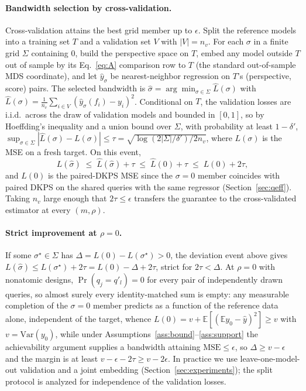 \documentclass{article}
\theoremstyle{definition}
\theoremstyle{plain}
\begin{document}
\paragraph{Bandwidth selection by cross-validation.} Cross-validation attains
the best grid member up to $\epsilon$. Split the reference models into a training
set $T$ and a validation set $V$ with $|V|=n_v$. For each $\sigma$ in a finite grid
$\Sigma$ containing $0$, build the
perspective space on $T$, embed any model outside $T$ out of sample by its
Eq.~\eqref{eq:A} comparison row to $T$ (the standard out-of-sample MDS coordinate), and let
$\hat y_\sigma$ be nearest-neighbor regression on $T$'s (perspective, score) pairs. The
selected bandwidth is $\hat\sigma=\arg\min_{\sigma\in\Sigma}\hat L(\sigma)$ with
$\hat L(\sigma)=\tfrac1{n_v}\sum_{i\in V}(\hat y_\sigma(f_i)-y_i)^2$. Conditional on
$T$, the validation losses are i.i.d.\ across the draw of validation models and bounded
in $[0,1]$, so by Hoeffding's inequality and a union bound over $\Sigma$, with
probability at least $1-\delta'$,
$\sup_{\sigma\in\Sigma}|\hat L(\sigma)-L(\sigma)|\le
\tau=\sqrt{\log(2|\Sigma|/\delta')/2n_v}$, where $L(\sigma)$ is the MSE on a fresh
target. On this event,
\[
L(\hat\sigma)\;\le\;\hat L(\hat\sigma)+\tau\;\le\;\hat L(0)+\tau
\;\le\;L(0)+2\tau,
\]
and $L(0)$ is the paired-DKPS MSE since the $\sigma=0$ member coincides with paired
DKPS on the shared queries with the same regressor (Section~\ref{sec:qeff}). Taking
$n_v$ large enough that $2\tau\le\epsilon$ transfers the guarantee to the
cross-validated estimator at every $(m,\rho)$.

\paragraph{Strict improvement at $\rho=0$.} If some
$\sigma^\star\in\Sigma$ has $\Delta=L(0)-L(\sigma^\star)>0$, the deviation event
above gives $L(\hat\sigma)\le L(\sigma^\star)+2\tau=L(0)-\Delta+2\tau$,
strict for $2\tau<\Delta$. At $\rho=0$ with nonatomic designs,
$\Pr(q_j=q'_l)=0$ for every pair of independently drawn queries, so almost surely every
identity-matched sum is empty: any measurable completion of the $\sigma=0$ member
predicts as a function of the reference data alone, independent of the target, whence
$L(0)=v+\mathbb{E}[(\mathbb{E}y_{0}-\hat y)^2]\ge v$ with $v=\mathrm{Var}(y_{0})$,
while under
Assumptions~\ref{ass:bound}--\ref{ass:support} the achievability argument
supplies a bandwidth
attaining $\mathrm{MSE}\le\epsilon$, so $\Delta\ge v-\epsilon$ and the margin is at
least $v-\epsilon-2\tau\ge v-2\epsilon$. In practice we use leave-one-model-out
validation and a joint embedding (Section~\ref{sec:experiments}); the split protocol is
analyzed for independence of the validation losses.
\end{document}
